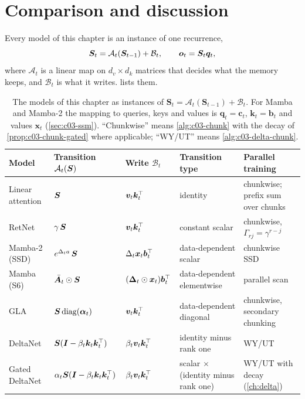 \section{Comparison and discussion}\label{sec:c03-comparison}

Every model of this chapter is an instance of one recurrence,
\begin{equation}\label{eq:c03-unified}
  \bm{S}_t=\mathcal{A}_t(\bm{S}_{t-1})+\mathcal{B}_t,\qquad \bm{o}_t=\bm{S}_t\bm{q}_t,
\end{equation}
where $\mathcal{A}_t$ is a linear map on $d_v\times d_k$ matrices that decides what the memory
keeps, and $\mathcal{B}_t$ is what it writes.  lists them.

\begin{table}[t]
\centering
\caption{The models of this chapter as instances of $\boldsymbol{S}_t=\mathcal{A}_t(\boldsymbol{S}_{t-1})+\mathcal{B}_t$.
For Mamba and Mamba-2 the mapping to queries, keys and values is $\boldsymbol{q}_t=\boldsymbol{c}_t$,
$\boldsymbol{k}_t=\boldsymbol{b}_t$ and values $\boldsymbol{x}_t$ (\cref{sec:c03-ssm}). ``Chunkwise'' means
\cref{alg:c03-chunk} with the decay of \cref{prop:c03-chunk-gated} where applicable; ``WY/UT'' means
\cref{alg:c03-delta-chunk}.}
\label{tab:c03-unified}
\small
\begin{tabularx}{\textwidth}{@{}lll>{\raggedright\arraybackslash}p{2.6cm}>{\raggedright\arraybackslash}X@{}}
\toprule
Model & Transition $\mathcal{A}_t(\bm{S})$ & Write $\mathcal{B}_t$ & Transition type & Parallel training \\
\midrule
Linear attention & $\bm{S}$ & $\bm{v}_t\bm{k}_t^{\top}$ & identity & chunkwise; prefix sum over chunks \\
RetNet & $\gamma\,\bm{S}$ & $\bm{v}_t\bm{k}_t^{\top}$ & constant scalar & chunkwise, $\Gamma_{rj}=\gamma^{r-j}$ \\
Mamba-2 (SSD) & $e^{\Delta_ta}\,\bm{S}$ & $\Delta_t\bm{x}_t\bm{b}_t^{\top}$ & data-dependent scalar & chunkwise SSD \\
Mamba (S6) & $\bar{\bm{A}}_t\odot\bm{S}$ & $(\bm\Delta_t\odot\bm{x}_t)\bm{b}_t^{\top}$ & data-dependent elementwise & parallel scan \\
GLA & $\bm{S}\operatorname{diag}(\bm{\alpha}_t)$ & $\bm{v}_t\bm{k}_t^{\top}$ & data-dependent diagonal & chunkwise, secondary chunking \\
DeltaNet & $\bm{S}(\bm{I}-\beta_t\bm{k}_t\bm{k}_t^{\top})$ & $\beta_t\bm{v}_t\bm{k}_t^{\top}$ & identity minus rank one & WY/UT \\
Gated DeltaNet & $\alpha_t\bm{S}(\bm{I}-\beta_t\bm{k}_t\bm{k}_t^{\top})$ & $\beta_t\bm{v}_t\bm{k}_t^{\top}$ & scalar $\times$ (identity minus rank one) & WY/UT with decay (\cref{ch:delta}) \\
\bottomrule
\end{tabularx}
\end{table}

